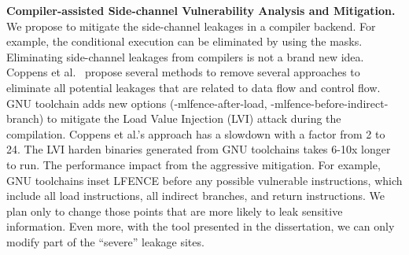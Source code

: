 \textbf{Compiler-assisted Side-channel Vulnerability Analysis and Mitigation.}
We propose to mitigate the side-channel leakages in a compiler backend. For example, the conditional execution can be eliminated by using the masks. Eliminating side-channel leakages from compilers is not a brand new idea. Coppens et al.~\cite{Coppens:2009:PMT:1607723.1608124} propose several methods to remove several approaches to eliminate all potential leakages that are related to data flow and control flow.  GNU toolchain adds new options (\textsf{-mlfence-after-load}, \textsf{-mlfence-before-indirect-branch}) to mitigate the Load Value Injection (LVI) attack during the compilation. Coppens et al.'s approach has a slowdown with a factor from 2 to 24. The LVI harden binaries generated from GNU toolchains takes 6-10x longer to run. The performance impact from the aggressive mitigation. For example, GNU toolchains inset LFENCE before any possible vulnerable instructions, which include all load instructions, all indirect branches, and return instructions. We plan only to change those points that are more likely to leak sensitive information. Even more, with the tool presented in the dissertation, we can only modify part of the ``severe'' leakage sites.